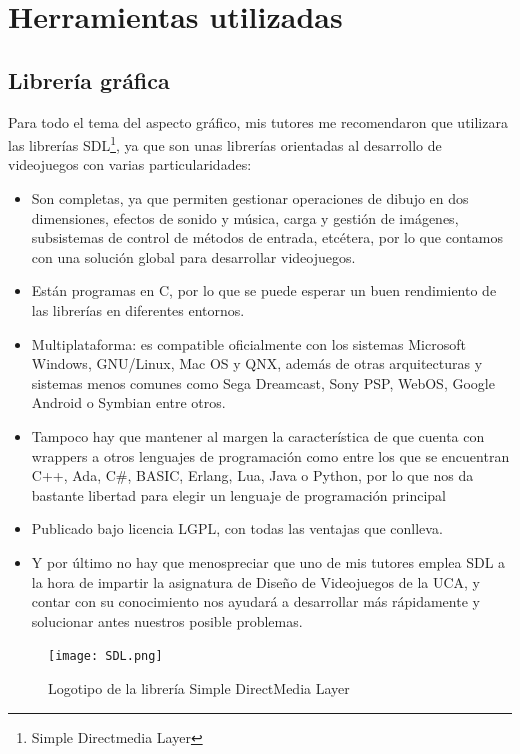 \section{Herramientas utilizadas}

\subsection{Librería gráfica}

Para todo el tema del aspecto gráfico, mis tutores me recomendaron que utilizara las librerías SDL\footnote{Simple
Directmedia Layer}, ya que son unas librerías orientadas al desarrollo de videojuegos con varias particularidades:
\begin{itemize}
    \item Son completas, ya que permiten gestionar operaciones de dibujo en dos dimensiones, efectos de
            sonido y música, carga y gestión de imágenes, subsistemas de control de métodos de entrada,
            etcétera, por lo que contamos con una solución global para desarrollar videojuegos.
    \item Están programas en C, por lo que se puede esperar un buen rendimiento de las librerías en
            diferentes entornos.
    \item Multiplataforma: es compatible oficialmente con los sistemas Microsoft Windows, GNU/Linux,
            Mac OS y QNX, además de otras arquitecturas y sistemas menos comunes como Sega Dreamcast, Sony PSP,
            WebOS, Google Android o Symbian entre otros.
    \item Tampoco hay que mantener al margen la característica de que cuenta con wrappers a otros lenguajes
            de programación como entre los que se encuentran C++, Ada, C\#, BASIC, Erlang, Lua, Java o Python, por
            lo que nos da bastante libertad para elegir un lenguaje de programación principal
    \item Publicado bajo licencia LGPL, con todas las ventajas que conlleva.
    \item Y por último no hay que menospreciar que uno de mis tutores emplea SDL a la hora de impartir la asignatura
            de Diseño de Videojuegos de la UCA, y contar con su conocimiento nos ayudará a desarrollar más rápidamente
            y solucionar antes nuestros posible problemas.
\end{itemize}

\begin{figure}[h]
  \label{logo-sdl}
  \begin{center}
    \texttt{[image: SDL.png]}
  \end{center}
  \caption{Logotipo de la librería Simple DirectMedia Layer}
\end{figure}

